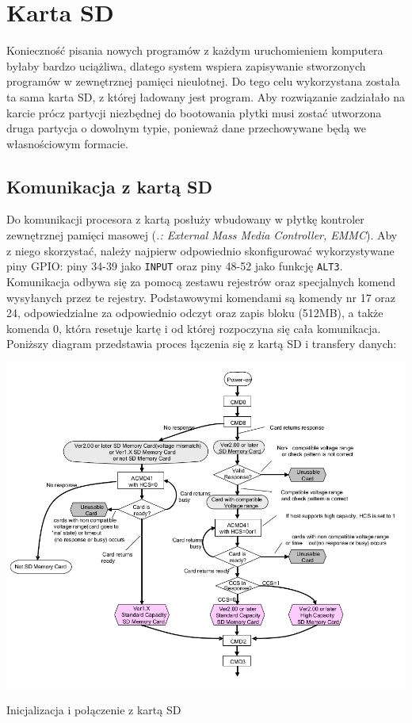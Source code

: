 \documentclass[shortabstract]{iithesis}
\begin{document}
\section{Karta SD}
Konieczność pisania nowych programów z każdym uruchomieniem komputera byłaby bardzo uciążliwa, dlatego system wspiera zapisywanie stworzonych programów w zewnętrznej pamięci nieulotnej. Do tego celu wykorzystana została ta sama karta SD, z której ładowany jest program. Aby rozwiązanie zadziałało na karcie prócz partycji niezbędnej do bootowania płytki musi zostać utworzona druga partycja o dowolnym typie, ponieważ dane przechowywane będą we własnościowym formacie. 
\subsection{Komunikacja z kartą SD}
Do komunikacji procesora z kartą posłuży wbudowany w płytkę kontroler zewnętrznej pamięci masowej (\textit{.: External Mass Media Controller, EMMC}). Aby z niego skorzystać, należy najpierw odpowiednio skonfigurować wykorzystywane piny GPIO: piny 34-39 jako \texttt{INPUT} oraz piny 48-52 jako funkcję \texttt{ALT3}. Komunikacja odbywa się za pomocą zestawu rejestrów oraz specjalnych komend wysyłanych przez te rejestry. Podstawowymi komendami są komendy nr 17 oraz 24, odpowiedzialne za odpowiednio odczyt oraz zapis bloku (512MB), a także komenda 0, która resetuje kartę i od której rozpoczyna się cała komunikacja.
Poniższy diagram przedstawia proces łączenia się z kartą SD i transfery danych:

\begingroup
\centering
\includegraphics[width=\textwidth]{sd-connection.png}
\captionsetup{type=figure}
\caption{Inicjalizacja i połączenie z kartą SD}
\endgroup
\end{document}

